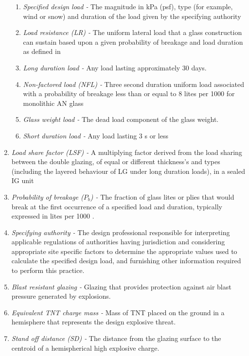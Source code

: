 \documentclass[12pt]{article}
\begin{document}
\begin{enumerate}
\begin{enumerate}
\item \textit{Specified design load -} The magnitude in kPa (psf), type (for 
example, wind or snow) and duration of the load given by the specifying 
authority
\item \textit{Load resistance (LR) -} The uniform lateral load that a glass 
construction can sustain based upon a given probability of breakage and load 
duration as defined in \cite{E1300} 
\item \textit{Long duration load -} Any load lasting approximately 30 days. 
\item \textit{Non-factored load (NFL) -} Three second duration uniform load 
associated with a probability of breakage less than or equal to 8 lites per 1000 
for monolithic AN glass
\item \textit{Glass weight load -} The dead load component of the glass weight. 
\item \textit{Short duration load -} Any load lasting 3 s or less
\end{enumerate}
\item \textit{Load share factor (LSF) -} A multiplying factor derived from the 
load sharing between the double glazing, of equal or different thickness's and 
types (including the layered behaviour of LG under long duration loads), in a 
sealed IG unit

\item \textit{Probability of breakage ($P_b$) -} The fraction of glass lites or 
plies that would break at the first occurrence of a specified load and duration, 
typically expressed in lites per 1000 \cite{C1036}.

\item \textit{Specifying authority -} The design professional responsible for 
interpreting applicable regulations of authorities having jurisdiction and 
considering appropriate site specific factors to determine the appropriate 
values used to calculate the specified design load, and furnishing other 
information required to perform this practice.

\item \textit{Blast resistant glazing -} Glazing that provides protection 
against air blast pressure generated by explosions. 
\item \textit{Equivalent TNT charge mass -} Mass of TNT placed on the ground in 
a hemisphere that represents the design explosive threat.

\item \textit{Stand off distance (SD) -} The distance from the glazing surface to the 
centroid of a hemispherical high explosive charge.
\end{enumerate}
\end{document}
